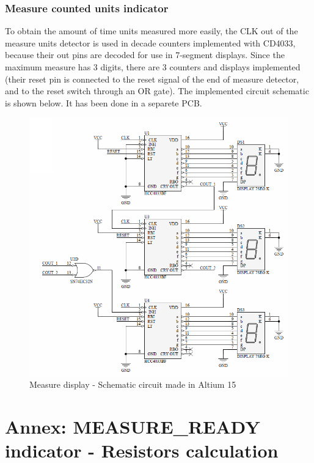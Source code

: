 \subsubsection*{Measure counted units indicator}

To obtain the amount of time units measured more easily, the CLK out of the
measure units detector is used in decade counters implemented with CD4033, because 
their out pins are decoded for use in 7-segment displays. Since the maximum measure 
has 3 digits, there are 3 counters and displays implemented (their reset pin is 
connected to the reset signal of the end of measure detector, and to the reset switch 
through an OR gate). The implemented circuit schematic is shown below. It has been done in 
a separete PCB.

\begin{figure}[H]
    \begin{centering}
    \includegraphics[width=1\textwidth]{Display}
    \par\end{centering}
    \caption{Measure display - Schematic circuit made in Altium 15}
\end{figure}

\newpage 
\section*{Annex: MEASURE\_READY indicator - Resistors calculation}

